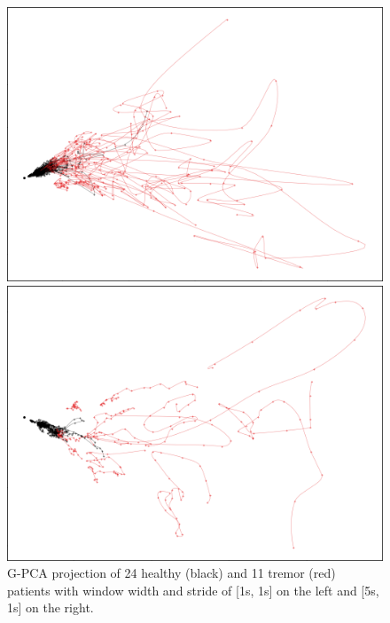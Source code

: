 \begin{figure}
\centering
\begin{minipage}{.5\textwidth}
  \centering
  \includegraphics[width=\linewidth]{figures/nemo/exp1.png}
\end{minipage}%
\begin{minipage}{.5\textwidth}
  \centering
  \includegraphics[width=\linewidth]{figures/nemo/exp1-5s-window.png}
\end{minipage}
\caption{G-PCA projection of 24 healthy (black) and 11 tremor (red) patients with window width and stride of [1s, 1s] on the left and [5s, 1s] on the right.}
\label{fig:exp1-gpca}
\end{figure}


